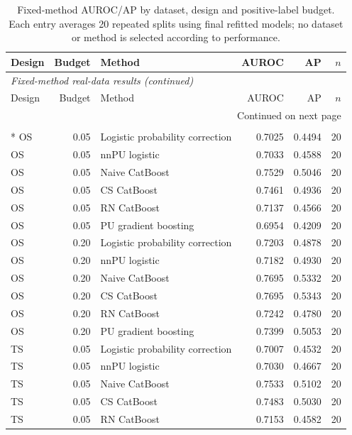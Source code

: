 \begingroup
\small
\setlength{\tabcolsep}{3.5pt}
\renewcommand{\arraystretch}{1.08}
\begin{longtable}{@{}p{0.65in}rp{2.85in}rrr@{}}
\caption{Fixed-method AUROC/AP by dataset, design and positive-label budget. Each entry averages 20 repeated splits using final refitted models; no dataset or method is selected according to performance.}\label{tab:s-real-fixed-methods}\\
\toprule
Design & Budget & Method & AUROC & AP & $n$ \\
\midrule
\endfirsthead
\multicolumn{6}{l}{\textit{Fixed-method real-data results (continued)}}\\
\toprule
Design & Budget & Method & AUROC & AP & $n$ \\
\midrule
\endhead
\midrule\multicolumn{6}{r}{Continued on next page}\\\endfoot
\bottomrule\endlastfoot
\multicolumn{6}{l}{\textbf{Credit Default}}\\*
OS & 0.05 & Logistic probability correction & 0.7025 & 0.4494 & 20 \\
OS & 0.05 & nnPU logistic & 0.7033 & 0.4588 & 20 \\
OS & 0.05 & Naive CatBoost & 0.7529 & 0.5046 & 20 \\
OS & 0.05 & CS CatBoost & 0.7461 & 0.4936 & 20 \\
OS & 0.05 & RN CatBoost & 0.7137 & 0.4566 & 20 \\
OS & 0.05 & PU gradient boosting & 0.6954 & 0.4209 & 20 \\
\addlinespace[2pt]
OS & 0.20 & Logistic probability correction & 0.7203 & 0.4878 & 20 \\
OS & 0.20 & nnPU logistic & 0.7182 & 0.4930 & 20 \\
OS & 0.20 & Naive CatBoost & 0.7695 & 0.5332 & 20 \\
OS & 0.20 & CS CatBoost & 0.7695 & 0.5343 & 20 \\
OS & 0.20 & RN CatBoost & 0.7242 & 0.4780 & 20 \\
OS & 0.20 & PU gradient boosting & 0.7399 & 0.5053 & 20 \\
\addlinespace[2pt]
TS & 0.05 & Logistic probability correction & 0.7007 & 0.4532 & 20 \\
TS & 0.05 & nnPU logistic & 0.7030 & 0.4667 & 20 \\
TS & 0.05 & Naive CatBoost & 0.7533 & 0.5102 & 20 \\
TS & 0.05 & CS CatBoost & 0.7483 & 0.5030 & 20 \\
TS & 0.05 & RN CatBoost & 0.7153 & 0.4582 & 20 \\

\end{longtable}
